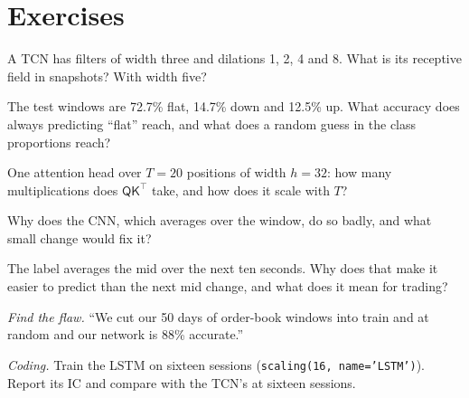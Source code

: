 \section{Exercises}

\begin{exercise}[$\star$]\label{exo:ml:sequence-models-on-order-books:1}
A TCN has filters of width three and dilations 1, 2, 4 and 8. What is its receptive field in snapshots? With width five?
\end{exercise}

\begin{exercise}[$\star$]\label{exo:ml:sequence-models-on-order-books:2}
The test windows are 72.7\% flat, 14.7\% down and 12.5\% up. What accuracy does always predicting ``flat'' reach, and what
does a random guess in the class proportions reach?
\end{exercise}

\begin{exercise}[$\star$]\label{exo:ml:sequence-models-on-order-books:3}
One attention head over $T = 20$ positions of width $h = 32$: how many multiplications does $\mathsf Q\mathsf K^\top$
take, and how does it scale with $T$?
\end{exercise}

\begin{exercise}[$\star\star$]\label{exo:ml:sequence-models-on-order-books:4}
Why does the CNN, which averages over the window, do so badly, and what small change would fix it?
\end{exercise}

\begin{exercise}[$\star\star$]\label{exo:ml:sequence-models-on-order-books:5}
The label averages the mid over the next ten seconds. Why does that make it easier to predict than the next mid change,
and what does it mean for trading?
\end{exercise}

\begin{exercise}[$\star\star$]\label{exo:ml:sequence-models-on-order-books:6}
\emph{Find the flaw.} ``We cut our 50 days of order-book windows into train and  at random and our network is 88\%
accurate.''
\end{exercise}

\begin{exercise}[$\star\star\star$]\label{exo:ml:sequence-models-on-order-books:7}
\emph{Coding.} Train the LSTM on sixteen sessions (\texttt{scaling(16, name='LSTM')}). Report its IC and compare with the
TCN's at sixteen sessions.
\end{exercise}

